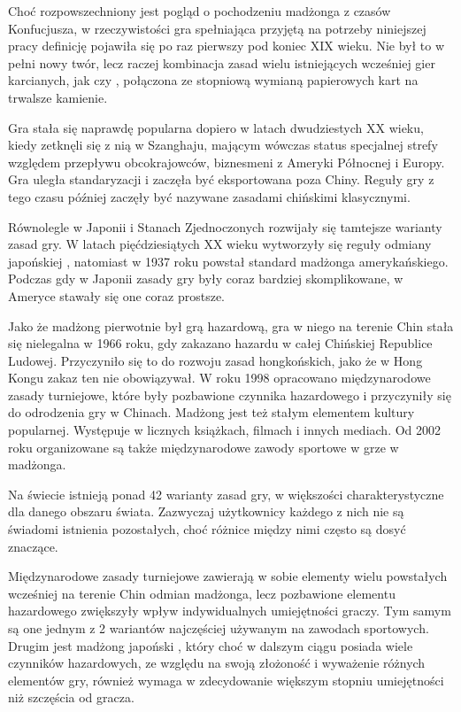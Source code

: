 \summary
Choć rozpowszechniony jest pogląd o pochodzeniu madżonga z czasów Konfucjusza, w
rzeczywistości gra spełniająca przyjętą na potrzeby niniejszej pracy definicję
pojawiła się po raz pierwszy pod koniec XIX wieku. Nie był to w pełni nowy
twór, lecz raczej kombinacja zasad wielu istniejących wcześniej gier karcianych,
jak  czy , połączona ze stopniową wymianą
papierowych kart na trwalsze kamienie.

Gra stała się naprawdę popularna dopiero w latach dwudziestych XX wieku, kiedy
zetknęli się z nią w Szanghaju, mającym wówczas status specjalnej strefy
względem przepływu obcokrajowców, biznesmeni z Ameryki Północnej i Europy. Gra
uległa standaryzacji i zaczęła być eksportowana poza Chiny. Reguły gry z tego
czasu później zaczęły być nazywane zasadami chińskimi klasycznymi. 

Równolegle w Japonii i Stanach Zjednoczonych rozwijały się tamtejsze warianty
zasad gry. W latach pięćdziesiątych XX wieku wytworzyły się reguły
odmiany japońskiej , natomiast w 1937 roku powstał standard
madżonga amerykańskiego. Podczas gdy w Japonii zasady gry były coraz bardziej
skomplikowane, w Ameryce stawały się one coraz prostsze.

Jako że madżong pierwotnie był grą hazardową, gra w niego na terenie Chin stała
się nielegalna w 1966 roku, gdy zakazano hazardu w całej Chińskiej Republice
Ludowej. Przyczyniło się to do rozwoju zasad hongkońskich, jako że w Hong Kongu
zakaz ten nie obowiązywał. W roku 1998 opracowano międzynarodowe zasady turniejowe,
które były pozbawione czynnika hazardowego i przyczyniły się do odrodzenia gry w
Chinach. Madżong jest też stałym elementem kultury popularnej. Występuje w
licznych książkach, filmach i innych mediach. Od 2002 roku organizowane są także
międzynarodowe zawody sportowe w grze w madżonga.

Na świecie istnieją ponad 42 warianty zasad gry, w większości charakterystyczne
dla danego obszaru świata. Zazwyczaj użytkownicy każdego z nich nie są świadomi
istnienia pozostałych, choć różnice między nimi często są dosyć znaczące.

Międzynarodowe zasady turniejowe zawierają w sobie elementy wielu powstałych
wcześniej na terenie Chin odmian madżonga, lecz pozbawione elementu hazardowego
zwiększyły wpływ indywidualnych umiejętności graczy. Tym samym są one jednym z 2
wariantów najczęściej używanym na zawodach sportowych. Drugim jest madżong
japoński , który choć w dalszym ciągu posiada wiele czynników
hazardowych, ze względu na swoją złożoność i wyważenie różnych elementów gry,
również wymaga w zdecydowanie większym stopniu umiejętności niż szczęścia od
gracza. 

